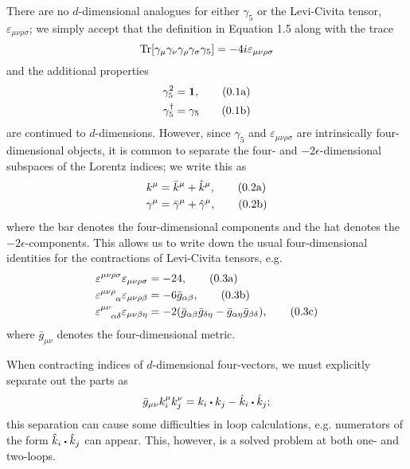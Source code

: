 \documentclass[12pt]{article}
\numberwithin{equation}{section}
\numberwithin{figure}{section}
\numberwithin{table}{section}
\newcommand{\numberthisa}{\addtocounter{equation}{1}\tag{\theequation a}}
\newcommand{\numberthisb}{\addtocounter{equation}{0}\tag{\theequation b}}
\newcommand{\numberthisc}{\addtocounter{equation}{0}\tag{\theequation c}}
\renewcommand{\theequation}{\arabic{section}.\arabic{equation}}
\newcommand{\ndot}{\mathrel{\raisebox{-2.3pt}{$ \!  \mathlarger{\mathlarger{\mathlarger{\mathlarger{\cdot}}}} \! $}}}
\begin{document}
	There are no \(d\)-dimensional analogues for either \(\gamma_5\) or the Levi-Civita tensor, \(\varepsilon_{\mu\nu\rho\sigma}\); we simply accept that the definition in Equation 1.5 along with the trace  
	\begin{equation}
	\Tr[\gamma_\mu\gamma_\nu\gamma_\rho\gamma_\sigma\gamma_5]=-4i\varepsilon_{\mu\nu\rho\sigma}
	\end{equation}
	and the additional properties  
	\begin{align*}
	\gamma_5^2 & =\mathbf{1}, \numberthisa\\
	\gamma_5^\dagger & =\gamma_5 \numberthisb
	\end{align*}
	are continued to \(d\)-dimensions. However, since \(\gamma_5\) and \(\varepsilon_{\mu\nu\rho\sigma}\) are intrinsically four-dimensional objects, it is common to separate the four- and \(-2\epsilon\)-dimensional subspaces of the Lorentz indices; we write this as  
	\begin{align*}
	k^\mu & =\bar{k}^\mu+\hat{k}^\mu, \numberthisa\\
	\gamma^\mu & =\bar{\gamma}^\mu+\hat{\gamma}^\mu, \numberthisb
	\end{align*}
	where the bar denotes the four-dimensional components and the hat denotes the \(-2\epsilon\)-components. This allows us to write down the usual four-dimensional identities for the contractions of Levi-Civita tensors, e.g.  
	\begin{align*}
	\varepsilon^{\mu\nu\rho\sigma}\varepsilon_{\mu\nu\rho\sigma} & =-24, \numberthisa\\
	\varepsilon\indices{^{\mu\nu\rho}_\alpha}\varepsilon_{\mu\nu\rho\beta} & =-6\bar{g}_{\alpha\beta}, \numberthisb\\
	\varepsilon\indices{^{\mu\nu}_{\alpha\delta}}\varepsilon_{\mu\nu\beta\eta} & =-2(\bar{g}_{\alpha\beta}\bar{g}_{\delta\eta}-\bar{g}_{\alpha\eta}\bar{g}_{\beta\delta}), \numberthisc
	\end{align*}
	where \(\bar{g}_{\mu\nu}\) denotes the four-dimensional metric. 
	
	When contracting indices of \(d\)-dimensional four-vectors, we must explicitly separate out the parts as  
	\begin{equation}
	\bar{g}_{\mu\nu}k_i^\mu k_j^\nu=k_i\ndot k_j-\hat{k}_i\ndot\hat{k}_j;
	\end{equation}
	this separation can cause some difficulties in loop calculations, e.g. numerators of the form \(\hat{k}_i\ndot\hat{k}_j\) can appear. This, however, is a solved problem at both one- and two-loops. 
	
\end{document}
